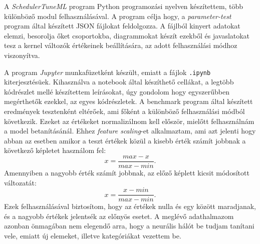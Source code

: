 
A \textit{SchedulerTuneML} program Python programozási nyelven készítettem, több különböző modul felhasználásával.
A program célja hogy, a \textit{parameter-test} program által készített JSON fájlokat feldolgozza. A fájlból kinyert adatokat elemzi, besorolja őket csoportokba, diagrammokat készít ezekből és javaslatokat tesz a kernel változók értékeinek beállítására, az adott felhasználási módhoz viszonyítva.



A program \textit{Jupyter} munkafüzetként készült, emiatt a fájlok \texttt{.ipynb} kiterjesztésüek. Kihasználva a notebook által készíthető cellákat, a legtöbb kódrészlet mellé készítettem leírásokat, úgy gondolom hogy egyszerűbben megérthetők ezekkel, az egyes kódrészletek.
A benchmark program által készített eredmények tesztenként eltérőek, ami főként a különböző felhasználási módból következik. Ezeket az értékeket normalizálnom kell először, mielőtt felhasználnám a model betanításánál. Ehhez \textit{feature scaling}-et alkalmaztam, ami azt jelenti hogy abban az esetben amikor a teszt értékek közül a kisebb érték számít jobbnak a következő képletet használom fel:
\begin{equation}
x = \frac{max-x}{max-min}.
\end{equation}
Amennyiben a nagyobb érték számít jobbnak, az előző képlett kicsit módosított változatát:
\begin{equation}
x = \frac{x-min}{max-min}.
\end{equation}
Ezek felhasználásával biztosítom, hogy az értékek nulla és egy között maradjanak, és a nagyobb értékek jelentsék az előnyös esetet.
A meglévő adathalmazom azonban önmagában nem elegendő arra, hogy a neurális hálót be tudjam tanítani vele, emiatt új elemeket, illetve kategóriákat vezettem be.
